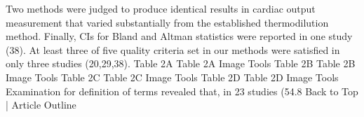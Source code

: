 \documentclass[]{article}
\begin{document}
	Two methods were judged to produce identical results in cardiac output measurement that varied substantially from the established thermodilution method. Finally, CIs for Bland and Altman statistics were reported in one study (38). At least three of five quality criteria set in our methods were satisfied in only three studies (20,29,38).
	Table 2A
	Table 2A
	Image Tools	Table 2B
	Table 2B
	Image Tools	Table 2C
	Table 2C
	Image Tools
	Table 2D
	Table 2D
	Image Tools
	Examination for definition of terms revealed that, in 23 studies (54.8%
	Back to Top | Article Outline
	
	\newpage
\end{document}
